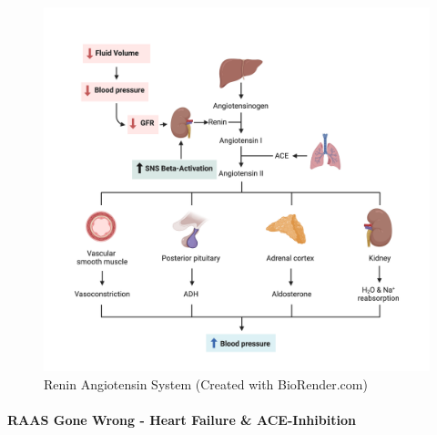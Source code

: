 \begin{figure}[!h]
    \centering
    \includegraphics[width=1\linewidth]{./figure/raas.png}
    \caption{Renin Angiotensin System \footnotesize{(Created with BioRender.com)}}
    \label{fig:raas}
\end{figure}

\paragraph{RAAS Gone Wrong - Heart Failure \& ACE-Inhibition}

